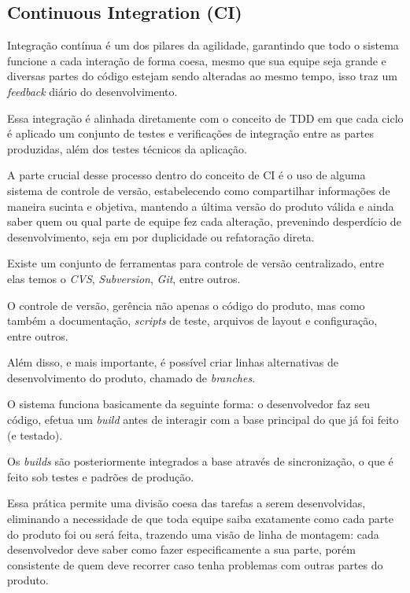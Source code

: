 \subsection{Continuous Integration (CI)}
\par Integração contínua é um dos pilares da agilidade, garantindo que todo o sistema funcione a cada interação de forma coesa, mesmo que sua equipe seja grande e diversas partes do código estejam sendo alteradas ao mesmo tempo, isso traz um \emph{feedback} diário do desenvolvimento. 
\par Essa integração é alinhada diretamente com o conceito de TDD em que cada ciclo é aplicado um conjunto de testes e verificações de integração entre as partes produzidas, além dos testes técnicos da aplicação.
\par A parte crucial desse processo dentro do conceito de CI é o uso de alguma sistema de controle de versão, estabelecendo como compartilhar informações de maneira sucinta e objetiva, mantendo a última versão do produto válida e ainda saber quem ou qual parte de equipe fez cada alteração, prevenindo desperdício de desenvolvimento, seja em por duplicidade ou refatoração direta. 
\par Existe um conjunto de ferramentas para controle de versão centralizado, entre elas temos o \emph{CVS}, \emph{Subversion}, \emph{Git}, entre outros.
\par O controle de versão, gerência não apenas o código do produto, mas como também a documentação, \emph{scripts} de teste, arquivos de layout e configuração, entre outros. 
\par Além disso, e mais importante, é possível criar linhas alternativas de desenvolvimento do produto, chamado de \emph{branches}.
\par  O sistema funciona basicamente da seguinte forma: o desenvolvedor faz seu código, efetua um \emph{build} antes de interagir com a base principal do que já foi feito (e testado). 
\par Os \emph{builds} são posteriormente integrados a base através de sincronização, o que é feito sob testes e padrões de produção. 
\par Essa prática permite uma divisão coesa das tarefas a serem desenvolvidas, eliminando a necessidade de que toda equipe saiba exatamente como cada parte do produto foi ou será feita, trazendo uma visão de linha de montagem: cada desenvolvedor deve saber como fazer especificamente a sua parte, porém consistente de quem deve recorrer caso tenha problemas com outras partes do produto.

